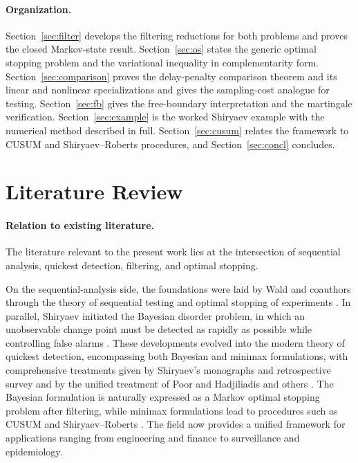 \documentclass[pdflatex,sn-mathphys-num]{sn-jnl}
\theoremstyle{plain}
\theoremstyle{definition}
\begin{document}
\paragraph{Organization.}
Section~\ref{sec:filter} develops the filtering reductions for both problems and
proves the closed Markov-state result. Section~\ref{sec:os} states the generic
optimal stopping problem and the variational inequality in complementarity form.
Section~\ref{sec:comparison} proves the delay-penalty comparison theorem and its
linear and nonlinear specializations and gives the sampling-cost analogue for
testing. Section~\ref{sec:fb} gives the free-boundary interpretation and the
martingale verification. Section~\ref{sec:example} is the worked Shiryaev example
with the numerical method described in full. Section~\ref{sec:cusum} relates the
framework to CUSUM and Shiryaev--Roberts procedures, and Section~\ref{sec:concl}
concludes.

\section{Literature Review}

\paragraph{Relation to existing literature.}

The literature relevant to the present work lies at the intersection of
sequential analysis, quickest detection, filtering, and optimal stopping.

On the sequential-analysis side, the foundations were laid by Wald and
coauthors through the theory of sequential testing and optimal stopping of
experiments
\citep{wald2004sequential,wald1948optimum,yu2026rigorous,chow1971great,griffith2021statistics}.
In parallel, Shiryaev initiated the Bayesian disorder problem, in which an
unobservable change point must be detected as rapidly as possible while
controlling false alarms
\citep{shiryaev1963optimum}. 
These developments evolved into the modern theory
of quickest detection, encompassing both Bayesian and minimax
formulations, with comprehensive treatments given by
Shiryaev's monographs and retrospective survey and by the
unified treatment of Poor and Hadjiliadis and others \citep{shiryaev2025optimal,poor2009quickest,shiryaev2010quickest,yu2026beyond,shiryaev2009stochastic,pollak1985diffusion,pollak1985optimal,moustakides1986optimal,shiryaev2019stochastic,cai2026optimal}. The Bayesian formulation is naturally
expressed as a Markov optimal stopping problem after filtering, while minimax
formulations lead to procedures such as CUSUM and Shiryaev--Roberts
\citep{page1954continuous,wang2025multi,lorden1971procedures,moustakides1986optimal,
pollak1985optimal,pollak2009optimality,polunchenko2018comparative,gao2022rolling}. The field
now provides a unified framework for applications ranging from engineering and
finance to surveillance and epidemiology.
\end{document}

